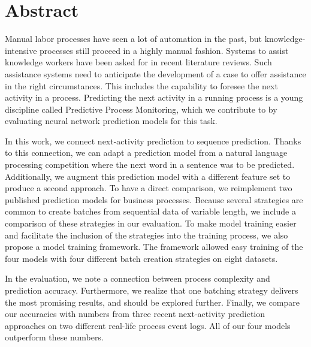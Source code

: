 


\begingroup
\let\clearpage\relax
\let\cleardoublepage\relax
\let\cleardoublepage\relax

\chapter*{Abstract}
Manual labor processes have seen a lot of automation in the past, but knowledge-intensive processes still proceed in a highly manual fashion.
Systems to assist knowledge workers have been asked for in recent literature reviews.
Such assistance systems need to anticipate the development of a case to offer assistance in the right circumstances.
This includes the capability to foresee the next activity in a process.
Predicting the next activity in a running process is a young discipline called Predictive Process Monitoring, which we contribute to by evaluating neural network prediction models for this task.

In this work, we connect next-activity prediction to sequence prediction.
Thanks to this connection, we can adapt a prediction model from a natural language processing competition where the next word in a sentence was to be predicted.
Additionally, we augment this prediction model with a different feature set to produce a second approach.
To have a direct comparison, we reimplement two published prediction models for business processes.
Because several strategies are common to create batches from sequential data of variable length, we include a comparison of these strategies in our evaluation.
To make model training easier and facilitate the inclusion of the strategies into the training process, we also propose a model training framework.
The framework allowed easy training of the four models with four different batch creation strategies on eight datasets.

In the evaluation, we note a connection between process complexity and prediction accuracy.
Furthermore, we realize that one batching strategy delivers the most promising results, and should be explored further.
Finally, we compare our accuracies with numbers from three recent next-activity prediction approaches on two different real-life process event logs.
All of our four models outperform these numbers.
\newpage
{}
